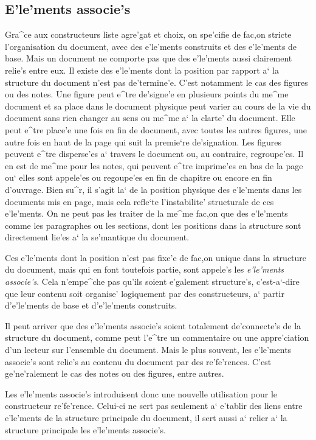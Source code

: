 \subsection{E'le'ments associe's}
\label{elemassoc}

Gra^ce aux constructeurs liste agre'gat et choix, on spe'cifie de fac,on stricte
l'organisation du document, avec des e'le'ments construits et des e'le'ments
de base. Mais un document ne comporte pas que des e'le'ments aussi clairement
relie's entre eux. Il existe des e'le'ments dont la position par rapport a`
la structure du document n'est pas de'termine'e. C'est notamment le cas des
figures ou des notes. Une figure peut e^tre de'signe'e en plusieurs points
du me^me document et sa place dans le document physique peut varier au
cours de la vie du document sans rien changer au sens ou me^me a` la
clarte' du document. Elle peut e^tre place'e une fois en fin de document,
avec toutes les autres figures, une autre fois en haut de la page qui
suit la premie`re de'signation. Les figures peuvent e^tre disperse'es a`
travers le document ou, au contraire, regroupe'es. Il en est de me^me pour les
notes, qui peuvent e^tre imprime'es en bas de la page ou` elles sont appele'es
ou regoupe'es en fin de chapitre ou encore en fin d'ouvrage. Bien su^r,
il s'agit la` de la position physique des e'le'ments dans les documents
mis en page, mais cela refle`te l'instabilite' structurale de ces e'le'ments.
On ne peut pas les traiter de la me^me fac,on que des e'le'ments comme les
paragraphes ou les sections, dont les positions dans la structure sont
directement lie'es a` la se'mantique du document.

Ces e'le'ments dont la position n'est pas fixe'e de fac,on unique dans la
structure du document, mais qui en font toutefois partie, sont appele's
les {\em e'le'ments associe's}. Cela n'empe^che pas qu'ils soient
e'galement structure's, c'est-a`-dire que leur contenu soit organise'
logiquement par des constructeurs, a` partir d'e'le'ments de base et
d'e'le'ments construits.

Il peut arriver que des e'le'ments associe's soient totalement de'connecte's
de la structure du document, comme peut l'e^tre un commentaire ou
une appre'ciation d'un lecteur sur l'ensemble du document.
Mais le plus souvent, les e'le'ments associe's sont relie's au contenu du
document par des re'fe'rences. C'est ge'ne'ralement le cas des notes ou
des figures, entre autres.

Les e'le'ments associe's introduisent donc une nouvelle utilisation pour le
constructeur re'fe'rence. Celui-ci ne sert pas seulement a` e'tablir des liens
entre e'le'ments de la structure principale du document, il sert aussi a`
relier a` la structure principale les e'le'ments associe's.

